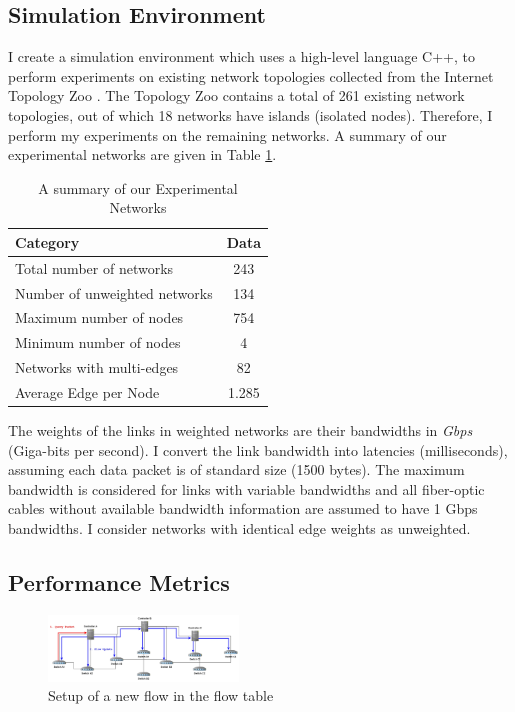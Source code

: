 \documentclass{IEEEtran}
\begin{document}
	\subsection{Simulation Environment}
	I create a simulation environment which uses a high-level language C++, to perform experiments on existing network topologies collected from the Internet Topology Zoo \cite{knight2011internet}. The Topology Zoo contains a total of 261 existing network topologies, out of which 18 networks have islands (isolated nodes). Therefore, I perform my experiments on the remaining networks. A summary of our experimental networks are given in Table \ref{tab:zooSummary}.
	\begin{table}
		\centering
		\caption{A summary of our Experimental Networks} \label{tab:zooSummary}
		\begin{tabular}{|l|c|}
			\hline
			\textbf{Category} & \textbf{Data} \\
			\hline
			Total number of networks & 243 \\
			\hline
			Number of unweighted networks & 134 \\
			\hline
			Maximum number of nodes & 754 \\
			\hline
			Minimum number of nodes & 4 \\
			\hline
			Networks with multi-edges & 82\\
			\hline
			Average Edge per Node & 1.285 \\
			\hline
		\end{tabular}
	\end{table}
	The weights of the links in weighted networks are their bandwidths in \textit{Gbps} (Giga-bits per second). I convert the link bandwidth into latencies (milliseconds), assuming each data packet is of standard size (1500 bytes). The maximum bandwidth is considered for links with variable bandwidths and all fiber-optic cables without available bandwidth information are assumed to have 1 Gbps bandwidths. I consider networks with identical edge weights as unweighted.
	\subsection{Performance Metrics}
	
	\begin{figure}
		\centering
		\includegraphics[width=0.45\textwidth]{Images/new_flow.jpg}
		\caption{Setup of a new flow in the flow table} \label{new_flow}
	\end{figure}
\end{document}
